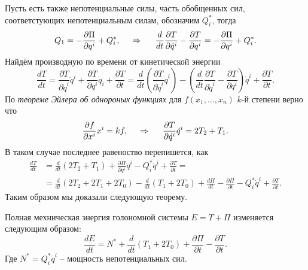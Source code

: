 Пусть есть также непотенциальные силы, часть обобщенных сил, соответстующих непотенциальным силам, обозначим $Q_i^*$, тогда
\begin{equation*}
    Q_1 = - \frac{\partial \Pi}{\partial q^i} + Q_i^*,
    \hspace{0.5cm} \Rightarrow \hspace{0.5cm} 
    \frac{d }{d t} \frac{\partial T}{\partial \dot{q}^i} - 
    \frac{\partial T}{\partial q^i} 
    =
    - \frac{\partial \Pi}{\partial q^i} + Q_i^*.
\end{equation*}
Найдём производную по времени от кинетической энергии
\begin{equation*}
    \frac{d T}{d t} = 
    \frac{\partial T}{\partial \dot{q}^i} \ddot{q}^i + \frac{\partial T}{\partial q^i} \dot{q}_i + \frac{\partial T}{\partial t}  =
    \frac{d }{d t} \left(
        \frac{\partial T}{\partial \dot{q}^i} \dot{q}^i
    \right) - \left(
        \frac{d }{d t} \frac{\partial T}{\partial \dot{q}^i} - \frac{\partial T}{\partial q^i} 
    \right) \dot{q}^i + \frac{\partial T}{\partial t}.
\end{equation*}
По \textit{теореме Эйлера об однороных функциях} для $f(x_1, \ldots, x_n)$ $k$-й степени верно что
\begin{equation*}
    \frac{\partial f}{\partial x^i} x^i = kf,
    \hspace{0.5cm} \Rightarrow \hspace{0.5cm} 
    \frac{\partial T}{\partial \dot{q}^i} \dot{q}^i = 2 T_2 + T_1.
\end{equation*}
В таком случае последнее равеноство перепишется, как
\begin{align*}
    \frac{d T}{d t} 
    &=
    \frac{d }{d t} (2 T_2 + T_1) + \frac{\partial \Pi}{\partial q^i} \dot{q}^i - Q_i^* \dot{q}^i + \frac{\partial T}{\partial t} 
    = \\ &= 
    \frac{d }{d t} (2 T_2 + 2 T_1 + 2 T_0) - \frac{d }{d t} (T_1 + 2 T_0) + \frac{d \Pi}{d t} - \frac{\partial \Pi}{\partial t} - Q_i^* \dot{q}^i + \frac{\partial T}{\partial t}.
\end{align*}
Таким образом мы доказали следующую теорему.

\begin{to_thr}
     Полная мехническая энергия голономной системы $E = T+ \Pi$ изменяется следующим образом:
     \begin{equation*}
         \frac{d E}{d t} = N^* + \frac{d }{d t} (T_1 + 2 T_0) + \frac{\partial \Pi}{\partial t} - \frac{\partial T}{\partial t}.
     \end{equation*}
     Где $N^* = Q^*_i \dot{q}^i$ -- мощность непотенциальных сил.
\end{to_thr}


